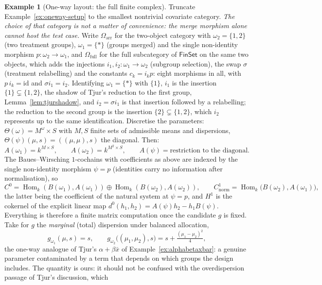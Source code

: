 \documentclass[11pt,a4paper]{article}
\theoremstyle{plain}
\theoremstyle{definition}
\newtheorem{example}[theorem]{Example}
\theoremstyle{remark}
\newcommand{\cat}[1]{\mathsf{#1}}
\newcommand{\catO}{\cat{\Omega}}
\newcommand{\FinSet}{\cat{FinSet}}
\newcommand{\id}{\mathrm{id}}
\DeclareMathOperator{\Hom}{Hom}
\begin{document}
\begin{example}[One-way layout: the full finite complex]\label{ex:oneway}
Truncate Example~\ref{ex:oneway-setup} to the smallest nontrivial covariate
category. \emph{The choice of that category is not a matter of convenience:
the merge morphism alone cannot host the test case.} Write
$\catO_{\mathrm{arr}}$ for the two-object category with $\omega_2 = \{1,2\}$
(two treatment groups), $\omega_1 = \{*\}$ (groups merged) and the single
non-identity morphism $p \colon \omega_2 \to \omega_1$, and
$\catO_{\mathrm{full}}$ for the full subcategory of $\FinSet$ on the same two
objects, which adds the injections $i_1, i_2 \colon \omega_1 \to \omega_2$
(subgroup selection), the swap $\sigma$ (treatment relabelling) and the
constants $c_k = i_k p$: eight morphisms in all, with $p\,i_k = \id$ and
$\sigma i_1 = i_2$. Identifying $\omega_1 = \{*\}$ with $\{1\}$, $i_1$ is
the insertion $\{1\} \subsetneq \{1,2\}$, the shadow of Tjur's reduction
to the first group, Lemma~\ref{lem:tjurshadow}, and $i_2 = \sigma i_1$
is that insertion followed by a relabelling; the reduction to the second
group is the insertion $\{2\} \subsetneq \{1,2\}$, which $i_2$ represents up
to the same identification. Discretise the parameters:
$\Theta(\omega) = M^{\omega} \times S$ with $M, S$ finite sets of admissible
means and dispersions, $\Theta(\psi)(\mu, s) = ((\mu,\mu), s)$ the diagonal.
Then:
\[
A(\omega_1) = k^{M \times S}, \qquad
A(\omega_2) = k^{M^{2} \times S}, \qquad
A(\psi) = \text{restriction to the diagonal}.
\]
The Baues--Wirsching $1$-cochains with coefficients as above are indexed by
the single non-identity morphism $\psi = p$ (identities carry no information
after normalisation), so
\[
C^{0} = \Hom_k(B(\omega_1), A(\omega_1)) \oplus \Hom_k(B(\omega_2),
A(\omega_2)),
\qquad
C^{1}_{\mathrm{norm}} = \Hom_k\bigl(B(\omega_2), A(\omega_1)\bigr),
\]
the latter being the coefficient of the natural system at $\psi = p$, and
$H^{1}$ is the cokernel of the explicit linear map
$d^{0}(h_1,h_2) = A(\psi)h_2 - h_1 B(\psi)$. Everything is therefore a finite
matrix computation once the candidate $g$ is fixed. Take for $g$ the
\emph{marginal} (total) dispersion under balanced allocation,
\[
g_{\omega_1}(\mu,s) = s,
\qquad
g_{\omega_2}\bigl((\mu_1,\mu_2),s\bigr) = s + \tfrac{(\mu_1-\mu_2)^2}{4},
\]
the one-way analogue of Tjur's $\alpha + \beta\bar x$ of
Example~\ref{ex:alphabetaxbar}: a genuine parameter contaminated by a term that
depends on which groups the design includes. The quantity is ours: it should
not be confused with the overdispersion passage of Tjur's discussion, which

\end{example}
\end{document}
